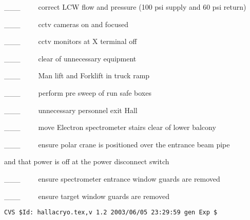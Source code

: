 \_\_\_~~~~~correct LCW flow and pressure (100 psi supply and 60 psi return)

\_\_\_~~~~~cctv cameras on and focused

\_\_\_~~~~~cctv monitors at X terminal off

\_\_\_~~~~~clear of unnecessary equipment

\_\_\_~~~~~Man lift and Forklift in truck ramp

\_\_\_~~~~~perform pre sweep of run safe boxes

\_\_\_~~~~~unnecessary personnel exit Hall

\_\_\_~~~~~move Electron spectrometer stairs clear of lower balcony

\_\_\_~~~~~ensure polar crane is positioned over the entrance beam pipe 

and that power is off at the power disconnect switch 

\_\_\_~~~~~ensure spectrometer entrance window guards are removed

\_\_\_~~~~~ensure target window guards are removed
%
%
{\small
\begin{verbatim}CVS $Id: hallacryo.tex,v 1.2 2003/06/05 23:29:59 gen Exp $\end{verbatim}
}
